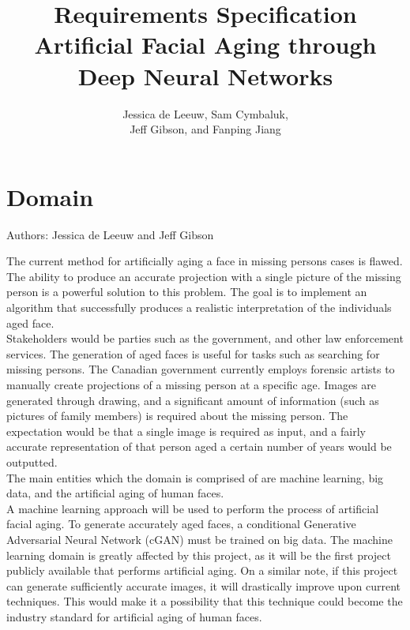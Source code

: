 \documentclass[12pt]{article}
\title{%
    Requirements Specification\\
    \large Artificial Facial Aging through Deep Neural Networks}
\author{Jessica de Leeuw, Sam Cymbaluk,\\
    Jeff Gibson, and Fanping Jiang}
\begin{document}
\maketitle


\newpage

\section {Domain}
Authors: Jessica de Leeuw and Jeff Gibson\\

\medskip

\noindent The current method for artificially aging a face in missing persons cases is flawed. The ability to produce an accurate projection with a single picture of the missing person is a powerful solution to this problem. The goal is to implement an algorithm that successfully produces a realistic interpretation of the individuals aged face. \\

Stakeholders would be parties such as the government, and other law enforcement services. The generation of aged faces is useful for tasks such as searching for missing persons. The Canadian government currently employs forensic artists to manually create projections of a missing person at a specific age. Images are generated through drawing, and a significant amount of information (such as pictures of family members) is required about the missing person. The expectation would be that a single image is required as input, and a fairly accurate representation of that person aged a certain number of years would be outputted.\\

The main entities which the domain is comprised of are machine learning, big data, and the artificial aging of human faces.\\

A machine learning approach will be used to perform the process of artificial facial aging. To generate accurately aged faces, a conditional Generative Adversarial Neural Network (cGAN) must be trained on big data. The machine learning domain is greatly affected by this project, as it will be the first project publicly available that performs artificial aging. On a similar note, if this project can generate sufficiently accurate images, it will drastically improve upon current techniques. This would make it a possibility that this technique could become the industry standard for artificial aging of human faces.\\
\end{document}

